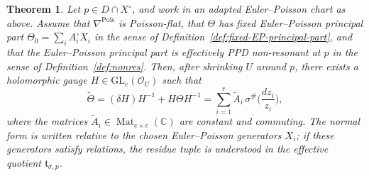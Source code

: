 \documentclass[10pt,a4paper]{amsart}
\newtheorem{theorem}{Theorem}
\newcommand{\C}{\mathbb{C}}
\newcommand{\GL}{\mathrm{GL}}
\DeclareMathOperator{\Mat}{Mat}
\newcommand{\OO}{\mathcal{O}}
\begin{document}
\begin{theorem} \label{thm:PPD-local}
Let $p\in D\cap X^\circ$, and work in an adapted Euler--Poisson chart as above.  Assume that $\nabla^{\mathrm{Pois}}$ is Poisson-flat, that $\Theta$ has fixed Euler--Poisson principal part $\Theta_0=\sum_i A_i^\circ X_i$ in the sense of Definition~\ref{def:fixed-EP-principal-part}, and that the Euler--Poisson principal part is effectively PPD non-resonant at $p$ in the sense of Definition~\ref{def:nonres}.  Then, after shrinking $U$ around $p$, there exists a holomorphic gauge $H\in\GL_e(\OO_U)$ such that
\begin{equation}\label{eq:PPD-Theta}
\widetilde\Theta=(\delta H)H^{-1}+H\Theta H^{-1}
=\sum_{i=1}^r \widetilde A_i\,\sigma^\#\Big(\frac{dz_i}{z_i}\Big),
\end{equation}
where the matrices $\widetilde A_i\in\Mat_{e\times e}(\C)$ are constant and commuting.  The normal form is written relative to the chosen Euler--Poisson generators $X_i$; if these generators satisfy relations, the residue tuple is understood in the effective quotient $\mathfrak t_{\sigma,p}$.
\end{theorem}
\end{document}
